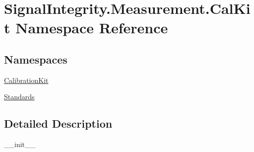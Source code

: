\hypertarget{namespaceSignalIntegrity_1_1Measurement_1_1CalKit}{}\section{Signal\+Integrity.\+Measurement.\+Cal\+Kit Namespace Reference}
\label{namespaceSignalIntegrity_1_1Measurement_1_1CalKit}
\subsection*{Namespaces}
\begin{DoxyCompactItemize}
\item 
 \hyperlink{namespaceSignalIntegrity_1_1Measurement_1_1CalKit_1_1CalibrationKit}{Calibration\+Kit}
\item 
 \hyperlink{namespaceSignalIntegrity_1_1Measurement_1_1CalKit_1_1Standards}{Standards}
\end{DoxyCompactItemize}


\subsection{Detailed Description}
\begin{DoxyVerb}__init__\end{DoxyVerb}
 